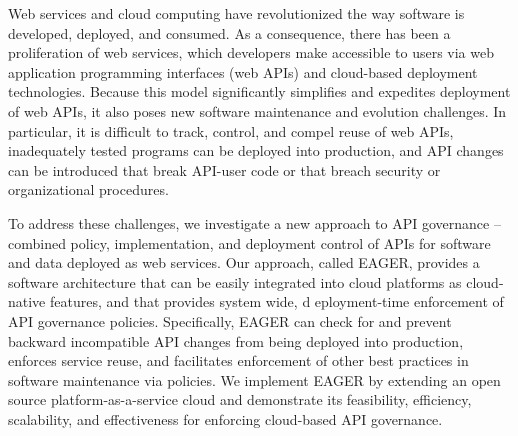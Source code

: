 Web services and cloud computing have revolutionized the way software is
developed, deployed, and consumed.  As a consequence, there has been a
proliferation of web services, which developers make accessible to users via
web application programming interfaces (web APIs) and cloud-based deployment
technologies.  Because this model significantly simplifies and expedites
deployment of web APIs, it also poses new software maintenance and evolution
challenges.  In particular, it is difficult to track, control, and compel
reuse of web APIs, inadequately tested programs can be
deployed into production, and API changes can be introduced that
break API-user code or that breach security or organizational procedures.

To address these challenges, we investigate a new approach to API governance
-- combined policy, implementation, and deployment control of APIs for
software and data deployed as web services.  Our approach, called EAGER,
provides a software architecture that can be easily integrated into cloud
platforms as cloud-native features, and that provides system wide, d
eployment-time enforcement of API governance policies.
Specifically, EAGER can check for and
prevent backward incompatible API changes from
being deployed into production,
enforces service reuse, and facilitates enforcement of other best practices
in software maintenance via policies.  We implement EAGER by
extending an open source platform-as-a-service cloud and
demonstrate its feasibility, efficiency,
scalability, and effectiveness for enforcing cloud-based API governance.

